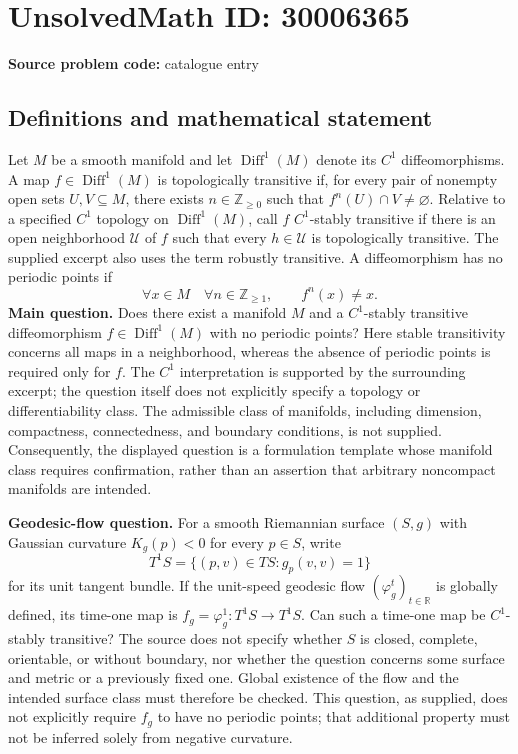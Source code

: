 \documentclass[11pt]{article}
\newcommand{\Z}{\mathbb{Z}}
\newcommand{\R}{\mathbb{R}}
\begin{document}
\section*{UnsolvedMath ID: 30006365}
\textbf{Source problem code:} catalogue entry
\subsection{Definitions and mathematical statement}
Let \(M\) be a smooth manifold and let \(\operatorname{Diff}^{1}(M)\) denote its \(C^{1}\) diffeomorphisms. A map \(f\in\operatorname{Diff}^{1}(M)\) is topologically transitive if, for every pair of nonempty open sets \(U,V\subseteq M\), there exists \(n\in\Z_{\geq 0}\) such that \(f^{n}(U)\cap V\ne\varnothing\). Relative to a specified \(C^{1}\) topology on \(\operatorname{Diff}^{1}(M)\), call \(f\) \(C^{1}\)-stably transitive if there is an open neighborhood \(\mathcal U\) of \(f\) such that every \(h\in\mathcal U\) is topologically transitive. The supplied excerpt also uses the term robustly transitive. A diffeomorphism has no periodic points if
\[
\forall x\in M\quad\forall n\in\Z_{\geq 1},\qquad f^{n}(x)\ne x.
\]
\textbf{Main question.} Does there exist a manifold \(M\) and a \(C^{1}\)-stably transitive diffeomorphism \(f\in\operatorname{Diff}^{1}(M)\) with no periodic points? Here stable transitivity concerns all maps in a neighborhood, whereas the absence of periodic points is required only for \(f\). The \(C^{1}\) interpretation is supported by the surrounding excerpt; the question itself does not explicitly specify a topology or differentiability class. The admissible class of manifolds, including dimension, compactness, connectedness, and boundary conditions, is not supplied. Consequently, the displayed question is a formulation template whose manifold class requires confirmation, rather than an assertion that arbitrary noncompact manifolds are intended.

\textbf{Geodesic-flow question.} For a smooth Riemannian surface \((S,g)\) with Gaussian curvature \(K_g(p)<0\) for every \(p\in S\), write
\[
T^{1}S=\{(p,v)\in TS:g_p(v,v)=1\}
\]
for its unit tangent bundle. If the unit-speed geodesic flow \((\varphi_g^{t})_{t\in\R}\) is globally defined, its time-one map is \(f_g=\varphi_g^{1}:T^{1}S\to T^{1}S\). Can such a time-one map be \(C^{1}\)-stably transitive? The source does not specify whether \(S\) is closed, complete, orientable, or without boundary, nor whether the question concerns some surface and metric or a previously fixed one. Global existence of the flow and the intended surface class must therefore be checked. This question, as supplied, does not explicitly require \(f_g\) to have no periodic points; that additional property must not be inferred solely from negative curvature.
\end{document}
